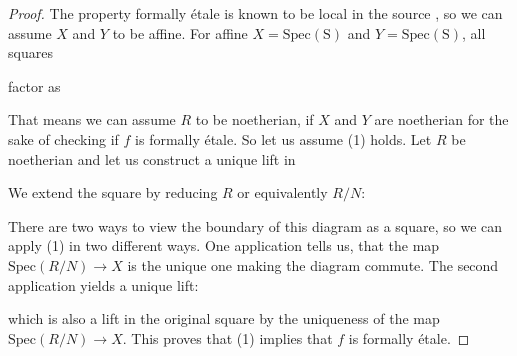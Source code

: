 \documentclass[9pt,twosided]{amsart}
\begin{document}
\begin{proof}
  The property formally étale is known to be local in the source \cite[§ 17.1.6]{GrothendieckDieudonne}, so we can assume $X$ and $Y$ to be affine.
  For affine $X=\mathrm{Spec(S)}$ and $Y=\mathrm{Spec(S)}$, all squares
  \begin{center}
  \end{center}
  factor as 
  \begin{center}
  \end{center}
  That means we can assume $R$ to be noetherian, if $X$ and $Y$ are noetherian for the sake of checking if $f$ is formally étale.
  So let us assume (1) holds. Let $R$ be noetherian and let us construct a unique lift in
  \begin{center}
  \end{center}
  We extend the square by reducing $R$ or equivalently $R/N$:
  \begin{center}
  \end{center}
  There are two ways to view the boundary of this diagram as a square, so we can apply (1) in two different ways.
  One application tells us, that the map $\mathrm{Spec}(R/N)\to X$ is the unique one making the diagram commute.
  The second application yields a unique lift:
  \begin{center}
  \end{center}
  which is also a lift in the original square by the uniqueness of the map $\mathrm{Spec}(R/N)\to X$.
  This proves that (1) implies that $f$ is formally étale.


\end{proof}
\end{document}
